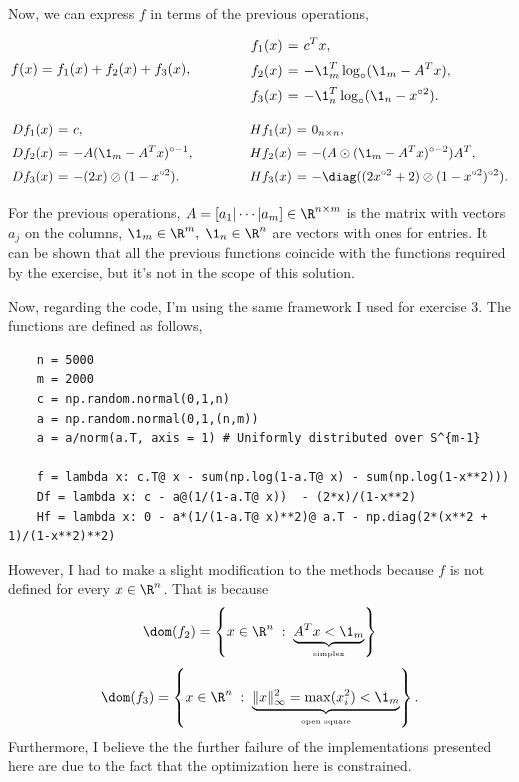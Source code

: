 Now, we can express $f$ in terms of the previous operations,
\[ \hspace*{-4em} f(x) = f_1(x) + f_2(x)+ f_3(x),
\hspace{4em} 
\everymath{\displaystyle}
\arraycolsep=1.8pt\def\arraystretch{1.5}
\begin{array}{rcl}
    f_1(x) & = & c^T x,\\
    f_2(x) & = & - \1_{m}^T\log_\circ(\1_m - A^T x),\\
    f_3(x) & = & - \1_{n}^T\log_\circ(\1_n - x^{\circ 2}).
\end{array} \]
\[ \everymath{\displaystyle}
\arraycolsep=1.8pt\def\arraystretch{1.5}
\begin{array}{rcl}
    Df_1(x) & = & c,\\
    Df_2(x) & = & - A(\1_m - A^T x)^{\circ -1},\\
    Df_3(x) & = & - (2x)\oslash(1-x^{\circ 2}).
\end{array}
\hspace{4em} 
\begin{array}{rcl}
    Hf_1(x) & = & 0_{n\times n},\\
    Hf_2(x) & = & - (A\odot(\1_m - A^T x)^{\circ -2}) A^T,\\
    Hf_3(x) & = & - \diag((2x^{\circ 2} + 2)\oslash(1-x^{\circ 2})^{\circ 2}).
\end{array}
\]

For the previous operations, $A = [a_1 | \cdots | a_m] \in \R^{n\times m}$ is the matrix with vectors $a_j$ on the columns, $\1_m \in \R^m,\; \1_n \in \R^n$ are vectors with ones for entries. It can be shown that all the previous functions coincide with the functions required by the exercise, but it's not in the scope of this solution.

Now, regarding the code, I'm using the same framework I used for exercise 3. The functions are defined as follows,
\begin{verbatim}
    n = 5000
    m = 2000
    c = np.random.normal(0,1,n)
    a = np.random.normal(0,1,(n,m))
    a = a/norm(a.T, axis = 1) # Uniformly distributed over S^{m-1}

    f = lambda x: c.T@ x - sum(np.log(1-a.T@ x) - sum(np.log(1-x**2)))
    Df = lambda x: c - a@(1/(1-a.T@ x))  - (2*x)/(1-x**2)
    Hf = lambda x: 0 - a*(1/(1-a.T@ x)**2)@ a.T - np.diag(2*(x**2 + 1)/(1-x**2)**2)
\end{verbatim}

However, I had to make a slight modification to the methods because $f$ is not defined for every $x\in \R^n$. That is because
\[ \dom(f_2) = \left\{ x\in\R^n \;:\; \underbrace{A^T x < \1_m}_{\mbox{\tiny{simplex}}} \right\} \]
\[ \dom(f_3) = \left\{ x\in\R^n \;:\; \underbrace{ \|x\|_\infty^2 = \max(x_i^2) < \1_m}_{\mbox{\tiny{open square}}} \right\}. \]
Furthermore, I believe the the further failure of the implementations presented here are due to the fact that the optimization here is constrained.

